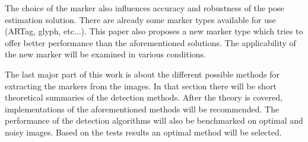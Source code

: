 The choice of the marker also influences accuracy and robustness of the pose estimation solution.
There are already some marker types available for use (ARTag, glyph, etc...).
This paper also proposes a new marker type which tries to offer better performance than the aforementioned solutions.
The applicability of the new marker will be examined in various conditions.

The last major part of this work is about the different possible methods for extracting the markers from the images.
In that section there will be short theoretical summaries of the detection methods.
After the theory is covered, implementations of the aforementioned methods will be recommended.
The performance of the detection algorithms will also be benchmarked on optimal and noisy images.
Based on the tests results an optimal method will be selected.
\vfill
